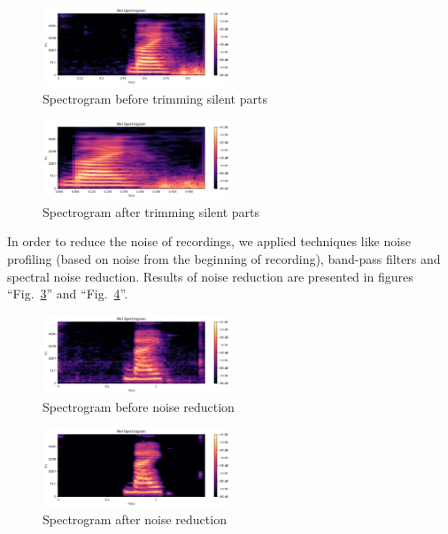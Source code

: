 \documentclass[conference]{IEEEtran}
\begin{document}
\begin{figure}[hbtp]
    \centerline{\includegraphics[width=0.5\textwidth]{Figures/Fig_Silence.png}}
    \caption{Spectrogram before trimming silent parts}
    \label{fig_Silence} %
    \end{figure}

\begin{figure}[hbtp]
    \centerline{\includegraphics[width=0.5\textwidth]{Figures/Fig_NoSilence.png}}
    \caption{Spectrogram after trimming silent parts}
    \label{fig_NoSilence} %
    \end{figure}

In order to reduce the noise of recordings, we applied techniques like noise profiling (based on noise from the beginning of recording), band-pass filters and spectral noise reduction.
Results of noise reduction are presented in figures ``Fig.~\ref{fig_NoiseBefore}'' and ``Fig.~\ref{fig_NoiseAfter}''.

\begin{figure}[hbtp]
    \centerline{\includegraphics[width=0.5\textwidth]{Figures/Fig_NoiseBefore.png}}
    \caption{Spectrogram before noise reduction}
    \label{fig_NoiseBefore} %
    \end{figure}

\begin{figure}[hbtp]
    \centerline{\includegraphics[width=0.5\textwidth]{Figures/Fig_NoiseAfter.png}}
    \caption{Spectrogram after noise reduction}
    \label{fig_NoiseAfter} %
    \end{figure}
\end{document}
